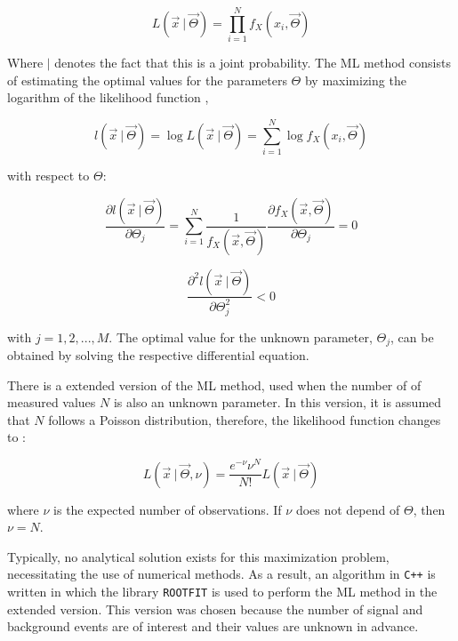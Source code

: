 \begin{equation}
L(\vec{x} \ | \ \vec{\Theta}) = \prod_{i = 1}^{N} f_X(x_i, \vec{\Theta}) 
\end{equation}

Where $|$ denotes the fact that this is a joint probability. The ML method consists of estimating the optimal values for the parameters $\Theta$ by maximizing the logarithm of the likelihood function \cite{mejia2012medida},

\begin{equation}
	l(\vec{x} \ | \ \vec{\Theta}) = \log L(\vec{x} \ | \ \vec{\Theta}) = \sum_{i = 1}^{N} \log f_X(x_i, \vec{\Theta})
\end{equation} 

with respect to $\Theta$:

\begin{equation}
	\frac{\partial{l(\vec{x} \ | \ \vec{\Theta})}}{\partial \Theta_j} = \sum_{i = 1}^{N} \frac{1}{f_X(\vec{x}, \vec{\Theta})} \frac{\partial{f_X(\vec{x}, \vec{\Theta})}}{\partial \Theta_j} = 0
\end{equation} 

\begin{equation}
	\frac{\partial^2{l(\vec{x} \ | \ \vec{\Theta})}}{\partial \Theta_j ^2} < 0
	\label{eq:ml}
\end{equation}

with $ j = 1, 2, ..., M$. The optimal value for the unknown parameter, $\Theta_j$, can be obtained by solving the respective differential equation.

There is a extended version of the ML method, used when the number of of measured values $N$ is also an unknown parameter. In this version, it is assumed that $N$ follows a Poisson distribution, therefore, the likelihood function changes to \cite{bonanomi2021response}:

\begin{equation}
	L(\vec{x} \ | \ \vec{\Theta}, \nu) = \frac{e^{-\nu} \nu^N}{N!} L(\vec{x} \ | \ \vec{\Theta})
\end{equation}

where $\nu$ is the expected number of observations. 
If $\nu$ does not depend of $\Theta$, then $\nu = N$. 

Typically, no analytical solution exists for this maximization problem, necessitating the use of numerical methods. As a result, an algorithm in \verb|C++| is written in which the library \verb|ROOTFIT| is used to perform the ML method in the extended version. This version was chosen because the number of signal and background events are of interest and their values are unknown in advance.

